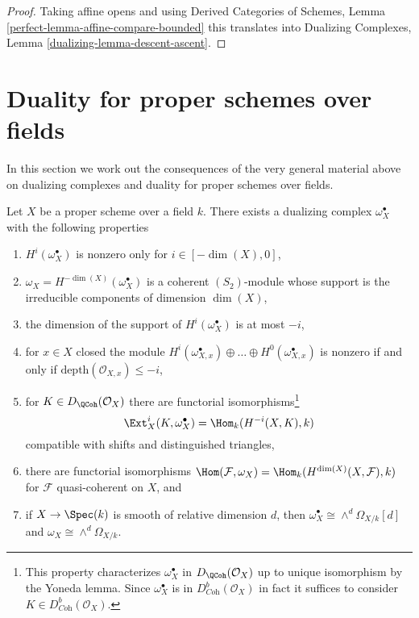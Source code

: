 \begin{proof}
Taking affine opens and using
Derived Categories of Schemes, Lemma \ref{perfect-lemma-affine-compare-bounded}
this translates into
Dualizing Complexes, Lemma \ref{dualizing-lemma-descent-ascent}.
\end{proof}







\section{Duality for proper schemes over fields}
\label{section-duality-proper-over-field}

\noindent
In this section we work out the consequences of the very general
material above on dualizing complexes and duality for proper schemes
over fields.

\begin{lemma}
\label{lemma-duality-proper-over-field}
Let $X$ be a proper scheme over a field $k$. There exists a dualizing complex
$\omega_X^\bullet$ with the following properties
\begin{enumerate}
\item $H^i(\omega_X^\bullet)$ is nonzero only for $i \in [-\dim(X), 0]$,
\item $\omega_X = H^{-\dim(X)}(\omega_X^\bullet)$ is a coherent
$(S_2)$-module whose support is the irreducible components
of dimension $\dim(X)$,
\item the dimension of the support of $H^i(\omega_X^\bullet)$ is at most $-i$,
\item for $x \in X$ closed the module
$H^i(\omega_{X, x}^\bullet) \oplus \ldots \oplus H^0(\omega_{X, x}^\bullet)$
is nonzero if and only if $\text{depth}(\mathcal{O}_{X, x}) \leq -i$,
\item for $K \in D_\QCoh(\mathcal{O}_X)$ there are functorial
isomorphisms\footnote{This property
characterizes $\omega_X^\bullet$ in $D_\QCoh(\mathcal{O}_X)$
up to unique isomorphism by the Yoneda lemma. Since $\omega_X^\bullet$
is in $D^b_{\textit{Coh}}(\mathcal{O}_X)$ in fact it suffices to consider
$K \in D^b_{\textit{Coh}}(\mathcal{O}_X)$.}
$$
\Ext^i_X(K, \omega_X^\bullet) = \Hom_k(H^{-i}(X, K), k)
$$
compatible with shifts and distinguished triangles,
\item there are functorial isomorphisms
$\Hom(\mathcal{F}, \omega_X) = \Hom_k(H^{\dim(X)}(X, \mathcal{F}), k)$
for $\mathcal{F}$ quasi-coherent on $X$, and
\item if $X \to \Spec(k)$ is smooth of relative dimension $d$,
then $\omega_X^\bullet \cong \wedge^d\Omega_{X/k}[d]$ and
$\omega_X \cong \wedge^d\Omega_{X/k}$.
\end{enumerate}
\end{lemma}

